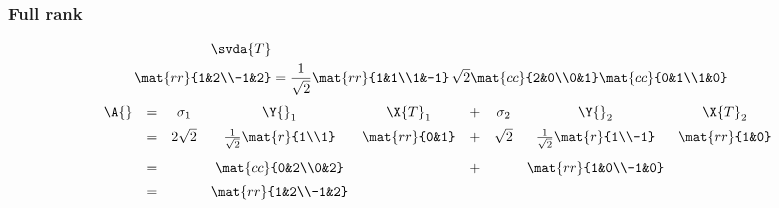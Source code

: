 \subsubsection{Full rank}
\begin{equation}
  \begin{split}
    \svda{T}\\
    \mat{rr}{1&2\\-1&2}&=\frac{1}{\sqrt{2}}\mat{rr}{1&1\\1&-1}\,\sqrt{2}\mat{cc}{2&0\\0&1}\mat{cc}{0&1\\1&0}    
  \end{split}
\end{equation}
%
\begin{equation}
  \begin{array}{ccccccccc}
    \A{} &=& \sigma_{1} & \Y{}_{1} & \X{T}_{1} &+& \sigma_{2} & \Y{}_{2} & \X{T}_{2} \\[5pt]
     &=& 2\sqrt{2} & \frac{1}{\sqrt{2}}\mat{r}{1\\1} & \mat{rr}{0&1} &+& \sqrt{2} & \frac{1}{\sqrt{2}}\mat{r}{1\\-1} & \mat{rr}{1&0}\\[10pt]
     &=&& \mat{cc}{0&2\\0&2} &&+&& \mat{rr}{1&0\\-1&0}\\[5pt]
     &=&& \mat{rr}{1&2\\-1&2}
  \end{array}
\end{equation}

